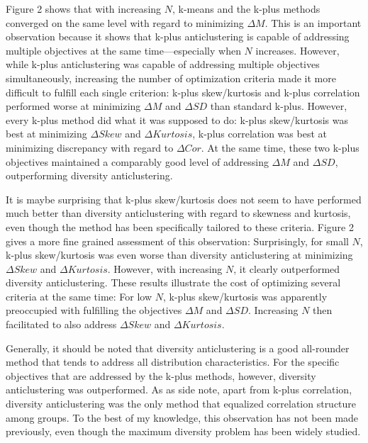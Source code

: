 \documentclass[
  man,floatsintext]{apa7}
\begin{document}
Figure 2 shows that with increasing \(N\), k-means and the k-plus methods converged on the same level with regard to minimizing \(\Delta \mathit{M}\). This is an important observation because it shows that k-plus anticlustering is capable of addressing multiple objectives at the same time---especially when \(N\) increases. However, while k-plus anticlustering was capable of addressing multiple objectives simultaneously, increasing the number of optimization criteria made it more difficult to fulfill each single criterion: k-plus skew/kurtosis and k-plus correlation performed worse at minimizing \(\Delta \mathit{M}\) and \(\Delta \mathit{SD}\) than standard k-plus. However, every k-plus method did what it was supposed to do: k-plus skew/kurtosis was best at minimizing \(\Delta \mathit{Skew}\) and \(\Delta \mathit{Kurtosis}\), k-plus correlation was best at minimizing discrepancy with regard to \(\Delta \mathit{Cor}\). At the same time, these two k-plus objectives maintained a comparably good level of addressing \(\Delta \mathit{M}\) and \(\Delta \mathit{SD}\), outperforming diversity anticlustering.

It is maybe surprising that k-plus skew/kurtosis does not seem to have performed much better than diversity anticlustering with regard to skewness and kurtosis, even though the method has been specifically tailored to these criteria. Figure 2 gives a more fine grained assessment of this observation: Surprisingly, for small \(N\), k-plus skew/kurtosis was even worse than diversity anticlustering at minimizing \(\Delta \mathit{Skew}\) and \(\Delta \mathit{Kurtosis}\). However, with increasing \(N\), it clearly outperformed diversity anticlustering. These results illustrate the cost of optimizing several criteria at the same time: For low \(N\), k-plus skew/kurtosis was apparently preoccupied with fulfilling the objectives \(\Delta \mathit{M}\) and \(\Delta \mathit{SD}\). Increasing \(N\) then facilitated to also address \(\Delta \mathit{Skew}\) and \(\Delta \mathit{Kurtosis}\).

Generally, it should be noted that diversity anticlustering is a good all-rounder method that tends to address all distribution characteristics. For the specific objectives that are addressed by the k-plus methods, however, diversity anticlustering was outperformed. As as side note, apart from k-plus correlation, diversity anticlustering was the only method that equalized correlation structure among groups. To the best of my knowledge, this observation has not been made previously, even though the maximum diversity problem has been widely studied.
\end{document}
